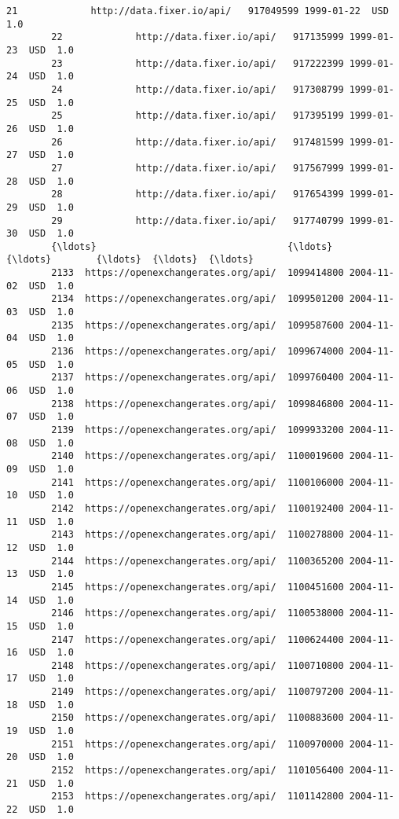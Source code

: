 \documentclass[11pt]{article}
\begin{document}
\begin{Verbatim}[commandchars=\\\{\}]
        21             http://data.fixer.io/api/   917049599 1999-01-22  USD  1.0   
        22             http://data.fixer.io/api/   917135999 1999-01-23  USD  1.0   
        23             http://data.fixer.io/api/   917222399 1999-01-24  USD  1.0   
        24             http://data.fixer.io/api/   917308799 1999-01-25  USD  1.0   
        25             http://data.fixer.io/api/   917395199 1999-01-26  USD  1.0   
        26             http://data.fixer.io/api/   917481599 1999-01-27  USD  1.0   
        27             http://data.fixer.io/api/   917567999 1999-01-28  USD  1.0   
        28             http://data.fixer.io/api/   917654399 1999-01-29  USD  1.0   
        29             http://data.fixer.io/api/   917740799 1999-01-30  USD  1.0   
        {\ldots}                                  {\ldots}         {\ldots}        {\ldots}  {\ldots}  {\ldots}   
        2133  https://openexchangerates.org/api/  1099414800 2004-11-02  USD  1.0   
        2134  https://openexchangerates.org/api/  1099501200 2004-11-03  USD  1.0   
        2135  https://openexchangerates.org/api/  1099587600 2004-11-04  USD  1.0   
        2136  https://openexchangerates.org/api/  1099674000 2004-11-05  USD  1.0   
        2137  https://openexchangerates.org/api/  1099760400 2004-11-06  USD  1.0   
        2138  https://openexchangerates.org/api/  1099846800 2004-11-07  USD  1.0   
        2139  https://openexchangerates.org/api/  1099933200 2004-11-08  USD  1.0   
        2140  https://openexchangerates.org/api/  1100019600 2004-11-09  USD  1.0   
        2141  https://openexchangerates.org/api/  1100106000 2004-11-10  USD  1.0   
        2142  https://openexchangerates.org/api/  1100192400 2004-11-11  USD  1.0   
        2143  https://openexchangerates.org/api/  1100278800 2004-11-12  USD  1.0   
        2144  https://openexchangerates.org/api/  1100365200 2004-11-13  USD  1.0   
        2145  https://openexchangerates.org/api/  1100451600 2004-11-14  USD  1.0   
        2146  https://openexchangerates.org/api/  1100538000 2004-11-15  USD  1.0   
        2147  https://openexchangerates.org/api/  1100624400 2004-11-16  USD  1.0   
        2148  https://openexchangerates.org/api/  1100710800 2004-11-17  USD  1.0   
        2149  https://openexchangerates.org/api/  1100797200 2004-11-18  USD  1.0   
        2150  https://openexchangerates.org/api/  1100883600 2004-11-19  USD  1.0   
        2151  https://openexchangerates.org/api/  1100970000 2004-11-20  USD  1.0   
        2152  https://openexchangerates.org/api/  1101056400 2004-11-21  USD  1.0   
        2153  https://openexchangerates.org/api/  1101142800 2004-11-22  USD  1.0   

\end{Verbatim}
\end{document}

